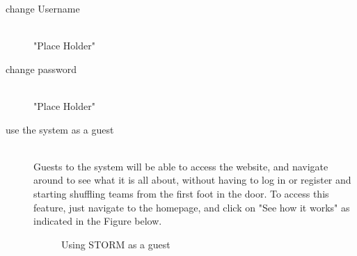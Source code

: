 \begin{description}
    	\item[change Username] \hfill \\
 		"Place Holder"
	\item[change password] \hfill \\
 		"Place Holder"
	\item[use the system as a guest] \hfill \\
 		Guests to the system will be able to access the website, and navigate around to see what it
		is all about, without having to log in or register and starting shuffling teams from the first foot in 		the door. To access this feature, just navigate to the homepage, and click on "See how it 			works" as indicated in the Figure below.\par
		\begin{figure}[h!] 
		\centering {}
		\caption{Using STORM as a guest}
		\end{figure}
				
\end{description}